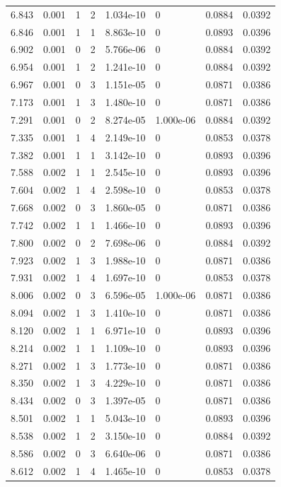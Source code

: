 \documentclass[preview]{standalone}
\begin{document}
{{{\begin{tabular}{L{1.2cm}C{1.2cm} C{0.3cm}C{0.5cm} C{1.4cm}C{1.4cm} C{1.4cm}C{1.4cm}}
  6.843  &  0.001  & 1     &  2 &  1.034e-10  & 0  & 0.0884 &  0.0392   \\ 
  6.846  &  0.001  & 1     &  1 &  8.863e-10  & 0  & 0.0893 &  0.0396   \\ 
  6.902  &  0.001  & 0     &  2 &  5.766e-06  & 0  & 0.0884 &  0.0392   \\ 
  6.954  &  0.001  & 1     &  2 &  1.241e-10  & 0  & 0.0884 &  0.0392   \\ 
  6.967  &  0.001  & 0     &  3 &  1.151e-05  & 0  & 0.0871 &  0.0386   \\ 
  7.173  &  0.001  & 1     &  3 &  1.480e-10  & 0  & 0.0871 &  0.0386   \\ 
  7.291  &  0.001  & 0     &  2 &  8.274e-05  & 1.000e-06  & 0.0884 &  0.0392   \\ 
  7.335  &  0.001  & 1     &  4 &  2.149e-10  & 0  & 0.0853 &  0.0378   \\ 
  7.382  &  0.001  & 1     &  1 &  3.142e-10  & 0  & 0.0893 &  0.0396   \\ 
  7.588  &  0.002  & 1     &  1 &  2.545e-10  & 0  & 0.0893 &  0.0396   \\ 
  7.604  &  0.002  & 1     &  4 &  2.598e-10  & 0  & 0.0853 &  0.0378   \\ 
  7.668  &  0.002  & 0     &  3 &  1.860e-05  & 0  & 0.0871 &  0.0386   \\ 
  7.742  &  0.002  & 1     &  1 &  1.466e-10  & 0  & 0.0893 &  0.0396   \\ 
  7.800  &  0.002  & 0     &  2 &  7.698e-06  & 0  & 0.0884 &  0.0392   \\ 
  7.923  &  0.002  & 1     &  3 &  1.988e-10  & 0  & 0.0871 &  0.0386   \\ 
  7.931  &  0.002  & 1     &  4 &  1.697e-10  & 0  & 0.0853 &  0.0378   \\ 
  8.006  &  0.002  & 0     &  3 &  6.596e-05  & 1.000e-06  & 0.0871 &  0.0386   \\ 
  8.094  &  0.002  & 1     &  3 &  1.410e-10  & 0  & 0.0871 &  0.0386   \\ 
  8.120  &  0.002  & 1     &  1 &  6.971e-10  & 0  & 0.0893 &  0.0396   \\ 
  8.214  &  0.002  & 1     &  1 &  1.109e-10  & 0  & 0.0893 &  0.0396   \\ 
  8.271  &  0.002  & 1     &  3 &  1.773e-10  & 0  & 0.0871 &  0.0386   \\ 
  8.350  &  0.002  & 1     &  3 &  4.229e-10  & 0  & 0.0871 &  0.0386   \\ 
  8.434  &  0.002  & 0     &  3 &  1.397e-05  & 0  & 0.0871 &  0.0386   \\ 
  8.501  &  0.002  & 1     &  1 &  5.043e-10  & 0  & 0.0893 &  0.0396   \\ 
  8.538  &  0.002  & 1     &  2 &  3.150e-10  & 0  & 0.0884 &  0.0392   \\ 
  8.586  &  0.002  & 0     &  3 &  6.640e-06  & 0  & 0.0871 &  0.0386   \\ 
  8.612  &  0.002  & 1     &  4 &  1.465e-10  & 0  & 0.0853 &  0.0378   \\ 
\hline 
\end{tabular} 

}}}
\end{document}
